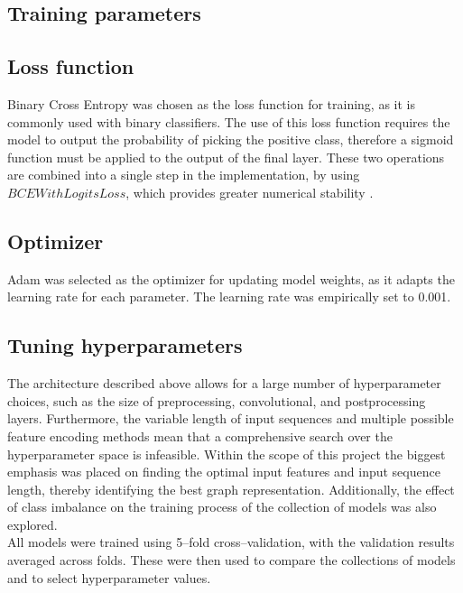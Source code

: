 \subsection{Training parameters}

\subsection{Loss function}
Binary Cross Entropy was chosen as the loss function for training, as it is commonly used with binary classifiers. 
The use of this loss function requires the model to output the probability of picking the positive class, therefore a sigmoid function must be applied to the output of the final layer.
These two operations are combined into a single step in the implementation, by using  $BCEWithLogitsLoss$, which provides greater numerical stability \cite{Ansel_PyTorch_2_Faster_2024}.

\subsection{Optimizer}
Adam was selected as the optimizer for updating model weights, as it adapts the learning rate for each parameter. The learning rate was empirically set to 0.001.

\subsection{Tuning hyperparameters}
The architecture described above allows for a large number of hyperparameter choices, such as the size of preprocessing, convolutional, and postprocessing layers. Furthermore, the variable length of input sequences and multiple possible feature encoding methods mean that a comprehensive search over the hyperparameter space is infeasible. Within the scope of this project the biggest emphasis was placed on finding the optimal input features and input sequence length, thereby identifying the best graph representation. Additionally, the effect of class imbalance on the training process of the collection of models was also explored.\\
All models were trained using 5--fold cross--validation, with the validation results averaged across folds. These were then used to compare the collections of models and to select hyperparameter values.